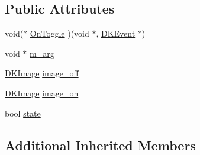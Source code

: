 \subsection*{Public Attributes}
\begin{DoxyCompactItemize}
\item 
void($\ast$ \hyperlink{class_d_k_toggle_ab7c5874a4fcfad5f4aad7a757c8a3790}{On\-Toggle} )(void $\ast$, \hyperlink{class_d_k_event}{D\-K\-Event} $\ast$)
\item 
void $\ast$ \hyperlink{class_d_k_toggle_ae043cb87e3c769e1ed65321a902a6b00}{m\-\_\-arg}
\item 
\hyperlink{class_d_k_image}{D\-K\-Image} \hyperlink{class_d_k_toggle_ad4a831fbb2512d02dadf25d76d1d1dec}{image\-\_\-off}
\item 
\hyperlink{class_d_k_image}{D\-K\-Image} \hyperlink{class_d_k_toggle_a6475bf752a782070cbaba85c5f22d7a1}{image\-\_\-on}
\item 
bool \hyperlink{class_d_k_toggle_ab6f9a31e36b51c88aeec88e462e1004c}{state}
\end{DoxyCompactItemize}
\subsection*{Additional Inherited Members}


